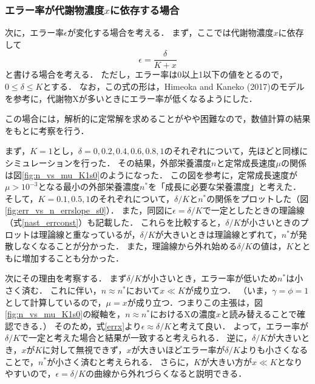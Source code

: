 \subsubsection{エラー率が代謝物濃度$x$に依存する場合}
次に，エラー率$\epsilon$が変化する場合を考える．
まず，ここでは代謝物濃度$x$に依存して
\begin{equation}
  \epsilon = \frac{\delta}{K + x} \label{errx}
\end{equation}
と書ける場合を考える．
ただし，エラー率は0以上1以下の値をとるので，$0 \le \delta \le K$とする．
なお，この式の形は，Himeoka and Kaneko (2017)のモデル\cite{hk17}を参考に，代謝物Xが多いときにエラー率が低くなるようにした．

この場合には，解析的に定常解を求めることがやや困難なので，数値計算の結果をもとに考察を行う．

まず，$K=1$とし，$\delta=0,0.2,0.4,0.6,0.8,1$のそれぞれについて，先ほどと同様にシミュレーションを行った．
その結果，外部栄養濃度$n$と定常成長速度$\mu$の関係は図\ref{fig:n_vs_mu_K1s0}のようになった．
この図を参考に，定常成長速度が$\mu > 10^{-3}$となる最小の外部栄養濃度$n^*$を「成長に必要な栄養濃度」と考えた．
そして，$K=0.1,0.5,1$のそれぞれについて，$\delta/K$と$n^*$の関係をプロットした（図\ref{fig:err_vs_n_errslope_s0}）．
また，同図に$\epsilon=\delta/K$で一定としたときの理論線（式\eqref{nast_errconst}）も記載した．
これらを比較すると，$\delta/K$が小さいときのプロットは理論線と重なっているが，$\delta/K$が大きいときは理論線とずれて，$n^*$が発散しなくなることが分かった．
また，理論線から外れ始める$\delta/K$の値は，$K$とともに増加することも分かった．

次にその理由を考察する．
まず$\delta/K$が小さいとき，エラー率が低いため$n^*$は小さく済む．
これに伴い，$n\approx n^*$において$x \ll K$が成り立つ．
（いま，$\gamma=\phi=1$として計算しているので，$\mu=x$が成り立つ．つまりこの主張は，図\ref{fig:n_vs_mu_K1s0}の縦軸を，$n\approx n^*$におけるXの濃度$x$と読み替えることで確認できる．）
そのため，式\eqref{errx}より$\epsilon \approx \delta/K$と考えて良い．
よって，エラー率が$\delta/K$で一定と考えた場合と結果が一致すると考えられる．
逆に，$\delta/K$が大きいとき，$x$が$K$に対して無視できず，$x$が大きいほどエラー率が$\delta/K$よりも小さくなることで，$n^*$が小さく済むと考えられる．
さらに，$K$が大きい方が$x \ll K$となりやすいので，$\epsilon=\delta/K$の曲線から外れづらくなると説明できる．

